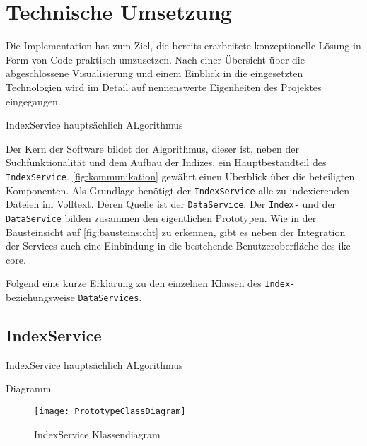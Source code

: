 \chapter{Technische Umsetzung} \label{implementation}

Die Implementation hat zum Ziel, die bereits erarbeitete konzeptionelle Lösung in Form von Code praktisch umzusetzen. Nach einer Übersicht über die abgeschlossene Visualisierung und einem Einblick in die eingesetzten Technologien wird im Detail auf nennenswerte Eigenheiten des Projektes eingegangen.


IndexService hauptsächlich ALgorithmus



\newpage




Der Kern der Software bildet der Algorithmus, dieser ist, neben der Suchfunktionalität und dem Aufbau der Indizes, ein Hauptbestandteil des \texttt{IndexService}. \autoref{fig:kommunikation} gewährt einen Überblick über die beteiligten Komponenten. Als Grundlage benötigt der \texttt{In\-dex\-Ser\-vice} alle zu indexierenden Dateien im Volltext. Deren Quelle ist der \texttt{Data\-Ser\-vice}. Der \texttt{Index-} und der \texttt{DataService} bilden zusammen den eigentlichen Prototypen. Wie in der Bausteinsicht auf \autoref{fig:bausteinsicht} zu erkennen, gibt es neben der Integration der Services auch eine Einbindung in die bestehende Benutzeroberfläche des \gls{ikc-core}.

Folgend eine kurze Erklärung zu den einzelnen Klassen des \texttt{Index-} beziehungsweise \texttt{DataServices}.

\section{IndexService}

IndexService hauptsächlich ALgorithmus

Diagramm
    \begin{figure}[H]
    \centering
    \texttt{[image: PrototypeClassDiagram]}
    \caption{IndexService Klassendiagram}
    \label{fig:indexserviceClassDiagram}
    \end{figure}

